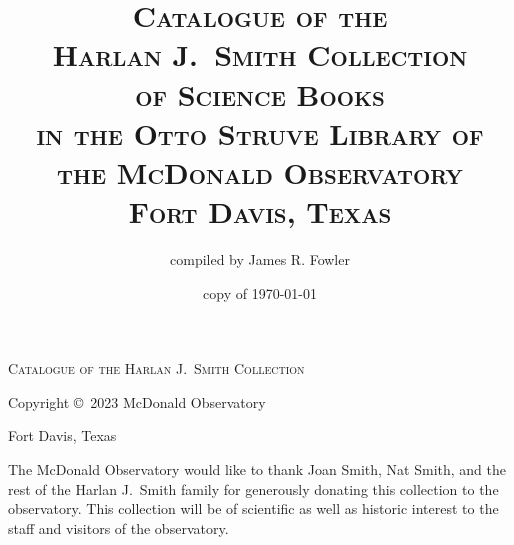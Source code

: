\documentclass[letterpaper]{book}
\begin{document}
\frontmatter
\thispagestyle{empty}
\vspace*{1 in}
\centerline{\textsc{\Large Catalogue of the Harlan J.~Smith Collection}}
\newpage

\thispagestyle{empty}
\title{\textsc{Catalogue of the \\
    Harlan J.\ Smith Collection \\
    of Science Books \\
    in the Otto Struve Library of \\
    the McDonald Observatory \\
    Fort Davis, Texas}}
\author{compiled by James R. Fowler}
\date{copy of \today}
\maketitle
\newpage
\thispagestyle{empty}
\vspace*{5 in}
\centerline{Copyright \copyright\ 2023 McDonald Observatory}
\centerline{Fort Davis, Texas}
\newpage

\thispagestyle{empty}
\noindent
The McDonald Observatory would like to thank Joan Smith,
Nat Smith, and the rest of the Harlan J.~Smith family
for generously donating this collection to the observatory.
This collection will be of scientific as well as historic
interest to the staff and visitors of the observatory.
\restoregeometry
\newpage
\end{document}
